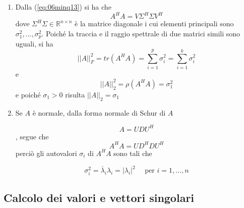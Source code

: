 \begin{thproof}
\begin{enumerate}
\item Dalla (\ref{eq:06minq13}) si ha che
$$A^H A = V\Sigma^H \Sigma V^H$$
dove $\Sigma^{H}\Sigma \in \mathbb{R}^{n\times n}$ \`e la matrice
diagonale i cui elementi principali sono 
$\sigma_1^{2},\ldots, \sigma_p^{2}$. Poich\'e la traccia e il raggio
spettrale di due matrici simili sono uguali, si ha
$$
||A||_F^{2} = tr(A^{H}A) = \displaystyle \sum_{i=1}^{p} \sigma_i^{2} =
\sum_{i=1}^{k} \sigma_i^{2}
$$
e
$$
||A||_{2}^{2} = \rho(A^{H}A) = \sigma_1^{2}
$$
e poich\'e $\sigma_1 > 0$ risulta $||A||_2 = \sigma_1$

\item Se $A$ \`e normale, dalla forma normale di Schur di $A$

$$A = U DU^{H}$$ ,
segue che
$$A^H A = UD^{H} DU^H$$
perci\`o gli autovalori $\sigma_i$ di $A^H A$ sono tali che

$$\sigma_i^{2} = \overline{\lambda}_i \lambda_i = |\lambda_i |^2
\quad \text{ per } i = 1, \ldots,n
$$

\end{enumerate}
 
\end{thproof}

\subsection{Calcolo dei valori e vettori singolari}

